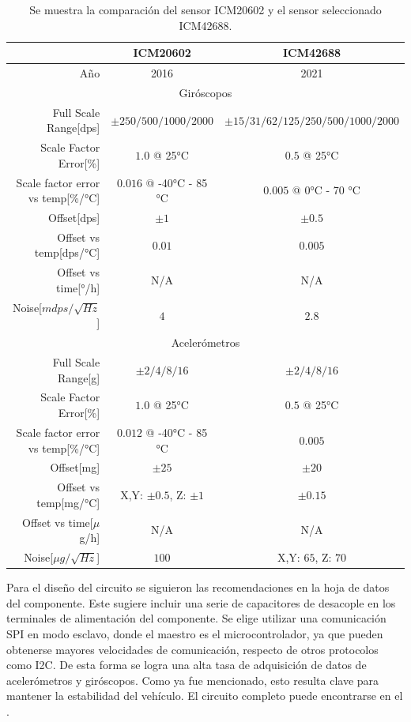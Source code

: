 \begin{table}[H]
    \centering
    \begin{tabular}{|r||c|c|}
        \hline
         & ICM20602 & ICM42688 \\
        \hline
        Año & 2016 & 2021\\
        \hline
        \multicolumn{3}{|c|}{Giróscopos}\\
        \hline
        Full Scale Range[dps] & $\pm 250/500/1000/2000$ & $\pm 15/31/62/125/250/500/1000/2000$\\
        Scale Factor Error[\%] & $1.0$ @ 25°C & $0.5$ @ 25°C\\
        Scale factor error vs temp[\%/°C] & $0.016$ @ -40°C - 85 °C & $0.005$ @ 0°C - 70 °C\\
        Offset[dps] & $\pm 1$ & $\pm 0.5$\\
        Offset vs temp[dps/°C] & $0.01$ & $0.005$\\
        Offset vs time[°/h] & N/A & N/A\\
        Noise[$mdps/\sqrt{Hz}$] & $4$ & $2.8$\\
        \hline
        \multicolumn{3}{|c|}{Acelerómetros}\\
        \hline
        Full Scale Range[g] & $\pm 2/4/8/16$ & $\pm 2/4/8/16 $\\
        Scale Factor Error[\%] & $1.0$ @ 25°C & $0.5$ @ 25°C\\
        Scale factor error vs temp[\%/°C] & $0.012$ @ -40°C - 85 °C & $0.005$\\
        Offset[mg] & $\pm 25$ & $\pm 20$\\
        Offset vs temp[mg/°C] & X,Y: $\pm 0.5$, Z: $\pm 1$ & $\pm 0.15$\\
        Offset vs time[$\mu$g/h] & N/A & N/A\\
        Noise[$\mu g/\sqrt{Hz}$] & $100$ & X,Y: $65$, Z: $70$\\        
        \hline       
    \end{tabular}
    \caption{Se muestra la comparación del sensor ICM20602 y el sensor seleccionado ICM42688.}
    \label{tab:comparacion_IMUs_TDK}
\end{table}

Para el diseño del circuito se siguieron las recomendaciones en la hoja de datos del componente. Este sugiere incluir una serie de capacitores de desacople en los terminales de alimentación del componente. Se elige utilizar una comunicación SPI en modo esclavo, donde el maestro es el microcontrolador, ya que pueden obtenerse mayores velocidades de comunicación, respecto de otros protocolos como I2C. De esta forma se logra una alta tasa de adquisición de datos de acelerómetros y giróscopos. Como ya fue mencionado, esto resulta clave para mantener la estabilidad del vehículo. El circuito completo puede encontrarse en el .

